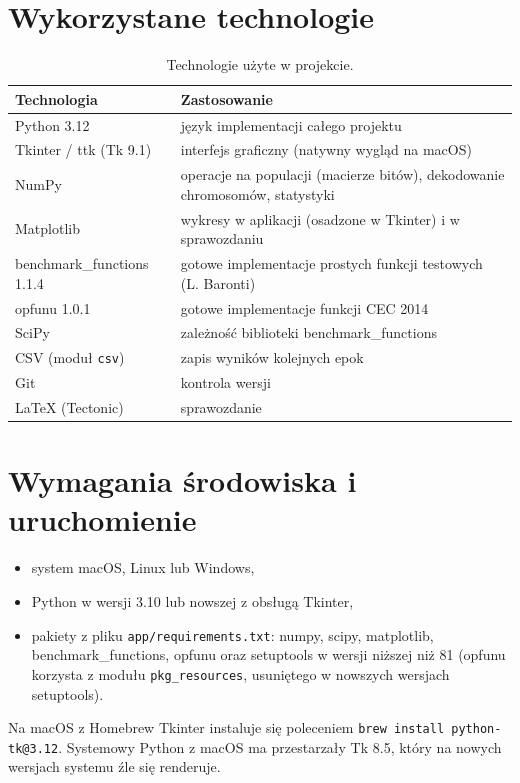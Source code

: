 \documentclass[11pt,a4paper]{article}
\begin{document}
\section{Wykorzystane technologie}

\begin{table}[H]
\centering
\begin{tabularx}{\textwidth}{lX}
\toprule
Technologia & Zastosowanie \\
\midrule
Python 3.12 & język implementacji całego projektu \\
Tkinter / ttk (Tk 9.1) & interfejs graficzny (natywny wygląd na macOS) \\
NumPy & operacje na populacji (macierze bitów), dekodowanie chromosomów, statystyki \\
Matplotlib & wykresy w aplikacji (osadzone w Tkinter) i w sprawozdaniu \\
benchmark\_functions 1.1.4 & gotowe implementacje prostych funkcji testowych (L. Baronti) \\
opfunu 1.0.1 & gotowe implementacje funkcji CEC 2014 \\
SciPy & zależność biblioteki benchmark\_functions \\
CSV (moduł \texttt{csv}) & zapis wyników kolejnych epok \\
Git & kontrola wersji \\
\LaTeX{} (Tectonic) & sprawozdanie \\
\bottomrule
\end{tabularx}
\caption{Technologie użyte w projekcie.}
\end{table}

\section{Wymagania środowiska i uruchomienie}

\begin{itemize}
  \item system macOS, Linux lub Windows,
  \item Python w wersji 3.10 lub nowszej z obsługą Tkinter,
  \item pakiety z pliku \texttt{app/requirements.txt}: numpy, scipy, matplotlib,
        benchmark\_functions, opfunu oraz setuptools w wersji niższej niż 81
        (opfunu korzysta z modułu \texttt{pkg\_resources}, usuniętego w nowszych wersjach setuptools).
\end{itemize}

Na macOS z Homebrew Tkinter instaluje się poleceniem \texttt{brew install python-tk@3.12}.
Systemowy Python z macOS ma przestarzały Tk 8.5, który na nowych wersjach systemu źle się renderuje.
\end{document}
